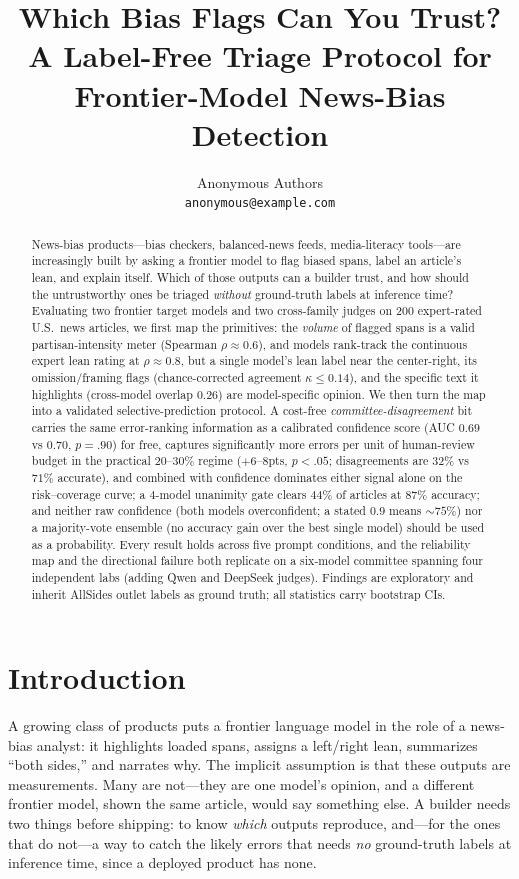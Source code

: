 \documentclass{article}
\title{Which Bias Flags Can You Trust?\\
A Label-Free Triage Protocol for\\
Frontier-Model News-Bias Detection}
\author{Anonymous Authors\\
\texttt{anonymous@example.com}}
\newcommand{\kap}{\kappa}
\begin{document}
\maketitle

\begin{abstract}
News-bias products---bias checkers, balanced-news feeds, media-literacy
tools---are increasingly built by asking a frontier model to flag biased
spans, label an article's lean, and explain itself. Which of those
outputs can a builder trust, and how should the untrustworthy ones be
triaged \emph{without} ground-truth labels at inference time? Evaluating
two frontier target models and two cross-family judges on 200
expert-rated U.S.\ news articles, we first map the primitives: the
\emph{volume} of flagged spans is a valid partisan-intensity meter
(Spearman $\rho \approx 0.6$), and models rank-track the continuous
expert lean rating at $\rho \approx 0.8$, but a single model's lean
label near the center-right, its omission/framing flags (chance-corrected
agreement $\kap \le 0.14$), and the specific text it highlights
(cross-model overlap $0.26$) are model-specific opinion. We then turn the
map into a validated selective-prediction protocol. A cost-free
\emph{committee-disagreement} bit carries the same error-ranking
information as a calibrated confidence score (AUC $0.69$ vs $0.70$,
$p{=}.90$) for free, captures significantly more errors per unit of
human-review budget in the practical $20$--$30\%$ regime ($+6$--$8$pts,
$p{<}.05$; disagreements are $32\%$ vs $71\%$ accurate), and combined
with confidence dominates either signal alone on the risk--coverage
curve; a
$4$-model unanimity gate clears $44\%$ of articles at $87\%$ accuracy;
and neither raw confidence (both models overconfident; a stated $0.9$
means ${\sim}75\%$) nor a majority-vote ensemble (no accuracy gain over
the best single model) should be used as a probability. Every result
holds across five prompt conditions, and the reliability map and the
directional failure both replicate on a six-model committee spanning
four independent labs (adding Qwen and DeepSeek judges). Findings are
exploratory and inherit AllSides outlet labels as ground truth; all
statistics carry bootstrap CIs.
\end{abstract}

\section{Introduction}
A growing class of products puts a frontier language model in the role
of a news-bias analyst: it highlights loaded spans, assigns a
left/right lean, summarizes ``both sides,'' and narrates why. The
implicit assumption is that these outputs are measurements. Many are
not---they are one model's opinion, and a different frontier model,
shown the same article, would say something else. A builder needs two
things before shipping: to know \emph{which} outputs reproduce, and---for
the ones that do not---a way to catch the likely errors that needs
\emph{no} ground-truth labels at inference time, since a deployed
product has none.
\end{document}
